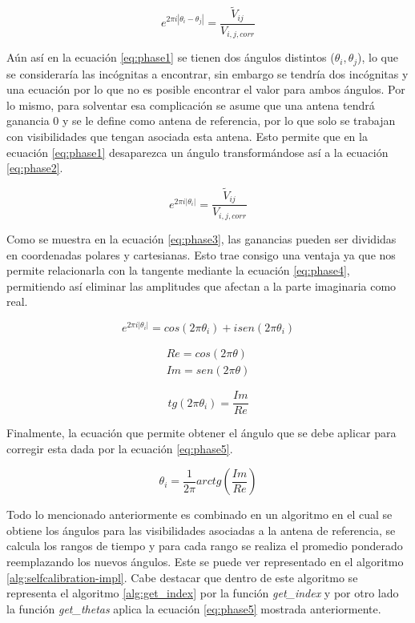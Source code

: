 \begin{equation}
    e^{2\pi i|\theta_{i} - \theta_{j}|}= \frac{\tilde{V}_{ij}}{V_{i,j,corr}}
    \label{eq:phase1}
\end{equation}

Aún así en la ecuación \ref{eq:phase1} se tienen dos ángulos distintos ($\theta_{i}, \theta_{j}$), lo que se consideraría las incógnitas a encontrar, sin embargo se tendría dos incógnitas y una ecuación por lo que no es posible encontrar el valor para ambos ángulos. Por lo mismo, para solventar esa complicación se asume que una antena tendrá ganancia 0 y se le define como antena de referencia, por lo que solo se trabajan con visibilidades que tengan asociada esta antena. Esto permite que en la ecuación \ref{eq:phase1} desaparezca un ángulo transformándose así a la ecuación \ref{eq:phase2}.

\begin{equation}
    e^{2\pi i|\theta_{i}|}= \frac{\tilde{V}_{ij}}{V_{i,j,corr}}
    \label{eq:phase2}
\end{equation}

Como se muestra en la ecuación \ref{eq:phase3}, las ganancias pueden ser divididas en coordenadas polares y cartesianas. Esto trae consigo una ventaja ya que nos permite relacionarla con la tangente mediante la ecuación \ref{eq:phase4}, permitiendo así eliminar las amplitudes que afectan a la parte imaginaria como real. 

\begin{equation}
    e^{2\pi i|\theta_{i}|} =  cos(2 \pi \theta_i) + i  sen(2 \pi \theta_i) 
    \label{eq:phase3}
\end{equation}

\begin{align} 
Re = cos(2 \pi \theta)\\ 
Im = sen(2 \pi \theta)
\end{align}


\begin{equation}
    tg(2\pi \theta_i) = \frac{Im}{Re}
    \label{eq:phase4}
\end{equation}

Finalmente, la ecuación que permite obtener el ángulo que se debe aplicar para corregir esta dada por la ecuación \ref{eq:phase5}.

\begin{equation}
    \theta_{i} = \frac{1}{2\pi}arctg(\frac{Im}{Re})
    \label{eq:phase5}
\end{equation}

Todo lo mencionado anteriormente es combinado en un algoritmo en el cual se obtiene los ángulos para las visibilidades asociadas a la antena de referencia, se calcula los rangos de tiempo y para cada rango se realiza el promedio ponderado reemplazando los nuevos ángulos. Este se puede ver representado en el algoritmo \ref{alg:selfcalibration-impl}. Cabe destacar que dentro de este algoritmo se representa el algoritmo \ref{alg:get_index} por la función \textit{get\_index} y por otro lado la función \textit{get\_thetas} aplica la ecuación \ref{eq:phase5} mostrada anteriormente. 


